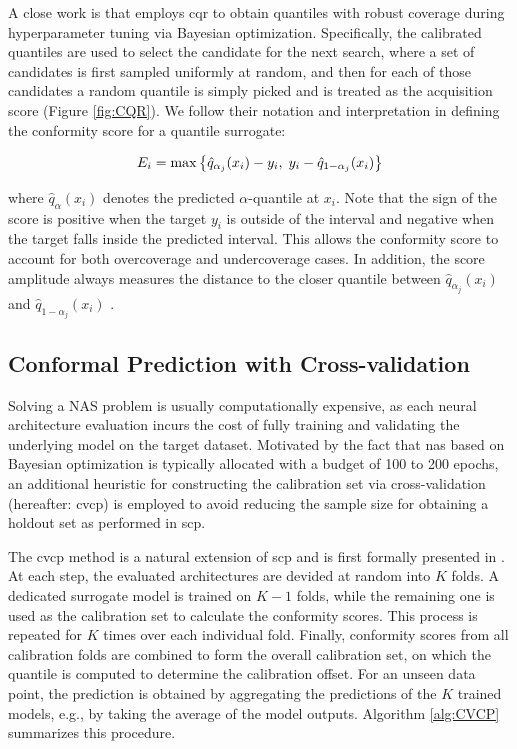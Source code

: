 {\begin{description}[leftmargin=0cm, listparindent=\parindent]
	 A close work is \cite{salinas2023optimizing} that employs \gls{cqr} to obtain quantiles with robust coverage during hyperparameter tuning via Bayesian optimization. Specifically, the calibrated quantiles are used to select the candidate for the next search, where a set of candidates is first sampled uniformly at random, and then for each of those candidates a random quantile is simply picked and is treated as the acquisition score (Figure \ref{fig:CQR}). We follow their notation and interpretation in defining the conformity score for a quantile surrogate:  
	 
	 \begin{equation}
		E_i = \max \big\{\hat{q}_{\alpha_j}(x_i) - y_i, \; y_i - \hat{q}_{1-\alpha_j}(x_i) \big\}
	 \vspace{0.7em}
	 \label{scoreCQR}
	 \end{equation}
	 
	 \noindent where $\hat{q}_{\alpha}(x_i)$ denotes the predicted $\alpha$-quantile at $x_i$. Note that the sign of the score is positive when the target $y_i$ is outside of the interval and negative when the target falls inside the predicted interval. This allows the conformity score to account for both overcoverage and undercoverage cases. In addition, the score amplitude always measures the distance to the closer quantile between $\hat{q}_{\alpha_j}(x_i)$ and $\hat{q}_{1-\alpha_j}(x_i)$ \cite{romano2019conformalized, salinas2023optimizing}.	 

\end{description}


\subsection{Conformal Prediction with Cross-validation}}
Solving a NAS problem is usually computationally expensive, as each neural architecture evaluation incurs the cost of fully training and validating the underlying model on the target dataset. Motivated by the fact that \gls{nas} based on Bayesian optimization is typically allocated with a budget of 100 to 200 epochs, an additional heuristic for constructing the calibration set via cross-validation (hereafter: \gls{cvcp}) is employed to avoid reducing the sample size for obtaining a holdout set as performed in \gls{scp}.

The \gls{cvcp} method is a natural extension of \gls{scp} and is first formally presented in  \cite{vovk2015cross}. At each step, the evaluated architectures are devided at random into $K$ folds. A dedicated surrogate model is trained on $K-1$ folds, while the remaining one is used as the calibration set to calculate the conformity scores. This process is repeated for $K$ times over each individual fold. Finally, conformity scores from all calibration folds are combined to form the overall calibration set, on which the quantile is computed to determine the calibration offset. For an unseen data point, the prediction is obtained by aggregating the predictions of the $K$ trained models, e.g., by taking the average of the model outputs.  Algorithm \ref{alg:CVCP} summarizes this procedure. 

